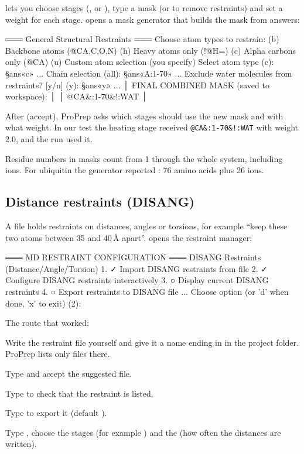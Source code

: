\medskip
{} lets you choose stages (,  or ), type a
mask (or  to remove restraints) and set a weight for each stage.
 opens a mask generator that builds the mask from answers:

\begin{screen}
═══ General Structural Restraints ═══
Choose atom types to restrain:
  (b) Backbone atoms (@CA,C,O,N)
  (h) Heavy atoms only (!@H=)
  (c) Alpha carbons only (@CA)
  (u) Custom atom selection (you specify)
Select atom type (c): §ans«c»
...
Chain selection (all): §ans«A:1-70»
...
Exclude water molecules from restraints? [y/n] (y): §ans«y»
...
│ FINAL COMBINED MASK (saved to workspace):                │
│   @CA&:1-70&!:WAT                                        │
\end{screen}

After  (accept), ProPrep asks which stages should use the new mask and
with what weight. In our test the heating stage received
\texttt{@CA\&:1-70\&!:WAT} with weight 2.0, and the run used it.

\begin{tip}
Residue numbers in masks count from 1 through the whole system, including
ions. For ubiquitin the generator reported :
76 amino acids plus 26 ions.
\end{tip}

\subsection{Distance restraints (DISANG)}

A  file holds restraints on distances, angles or torsions, for
example ``keep these two atoms between 35 and 40\,Å apart''.  opens
the restraint manager:

\begin{screen}
═══ MD RESTRAINT CONFIGURATION ═══
DISANG Restraints (Distance/Angle/Torsion)
  1. ✓ Import DISANG restraints from file
  2. ✓ Configure DISANG restraints interactively
  3. ○ Display current DISANG restraints
  4. ○ Export restraints to DISANG file
...
Choose option (or 'd' when done, 'x' to exit) (2):
\end{screen}

The route that worked:

\begin{steps}
  \item Write the restraint file yourself and give it a name ending in
         in the project folder. ProPrep lists only
         files there.
  \item Type  and accept the suggested file.
  \item Type  to check that the restraint is listed.
  \item Type  to export it (default ).
  \item Type , choose the stages (for example ) and the
         (how often the distances are
        written).
\end{steps}

